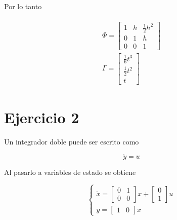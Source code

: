 \documentclass{article}
\begin{document}
        Por lo tanto 

        \begin{eqnarray}
            \begin{array}{c}
                \Phi = 
                \begin{bmatrix}
                    1 & h & \frac{1}{2}h^2 \\ 
                    0 & 1 & h \\
                    0 & 0 & 1 
                \end{bmatrix} \\ 
                \Gamma = 
                \begin{bmatrix}
                    \frac{1}{6} t^{3} \\ \frac{1}{2} t^{2} \\ t
                \end{bmatrix}
            \end{array}
        \end{eqnarray}

    \section{Ejercicio 2}

        Un integrador doble puede ser escrito como 

        \begin{equation}
            \ddot{ y } = u
        \end{equation}

        Al pasarlo a variables de estado se obtiene 

        \begin{equation}
            \left\{
                \begin{array}{c}
                    \dot{x} = 
                        \begin{bmatrix}
                            0 & 1 \\ 
                            0 & 0
                        \end{bmatrix} x + 
                        \begin{bmatrix}
                            0 \\ 1
                        \end{bmatrix} u
                    \\ 
                    y = \begin{bmatrix}
                        1 & 0
                    \end{bmatrix} x
                \end{array}
            \right.
        \end{equation}
\end{document}
